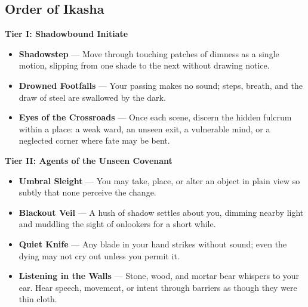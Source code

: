 \documentclass[11pt]{book}
\begin{document}

\subsection*{Order of Ikasha}
\begin{tcolorbox}[colback=mistgray!10,colframe=shadowviolet,title={Order of Ikasha --- Talents}]

\textbf{Tier I: Shadowbound Initiate}
\begin{itemize}[noitemsep]

  \item \textbf{Shadowstep} --- Move through touching patches of dimness as a single motion, slipping from one shade to the next without drawing notice.

  \item \textbf{Drowned Footfalls} --- Your passing makes no sound; steps, breath, and the draw of steel are swallowed by the dark.

  \item \textbf{Eyes of the Crossroads} --- Once each scene, discern the hidden fulcrum within a place: a weak ward, an unseen exit, a vulnerable mind, or a neglected corner where fate may be bent.

\end{itemize}


\textbf{Tier II: Agents of the Unseen Covenant}
\begin{itemize}[noitemsep]

  \item \textbf{Umbral Sleight} --- You may take, place, or alter an object in plain view so subtly that none perceive the change.

  \item \textbf{Blackout Veil} --- A hush of shadow settles about you, dimming nearby light and muddling the sight of onlookers for a short while.

  \item \textbf{Quiet Knife} --- Any blade in your hand strikes without sound; even the dying may not cry out unless you permit it.

  \item \textbf{Listening in the Walls} --- Stone, wood, and mortar bear whispers to your ear. Hear speech, movement, or intent through barriers as though they were thin cloth.


\end{itemize}
\end{tcolorbox}
\end{document}
